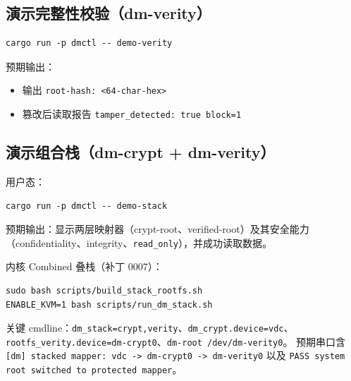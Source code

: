 \subsection{演示完整性校验（dm-verity）}

\begin{lstlisting}[basicstyle=\ttfamily\small, breaklines=true]
cargo run -p dmctl -- demo-verity
\end{lstlisting}

预期输出：
\begin{itemize}
    \item 输出 \texttt{root-hash: <64-char-hex>}
    \item 篡改后读取报告 \texttt{tamper\_\allowbreak detected: true block=1}
\end{itemize}

\subsection{演示组合栈（dm-crypt + dm-verity）}

用户态：

\begin{lstlisting}[basicstyle=\ttfamily\small, breaklines=true]
cargo run -p dmctl -- demo-stack
\end{lstlisting}

预期输出：显示两层映射器（crypt-root、verified-root）及其安全能力（confidentiality、integrity、\texttt{read\_\allowbreak only}），并成功读取数据。

内核 Combined 叠栈（补丁 0007）：

\begin{lstlisting}[basicstyle=\ttfamily\small, breaklines=true]
sudo bash scripts/build_stack_rootfs.sh
ENABLE_KVM=1 bash scripts/run_dm_stack.sh
\end{lstlisting}

\begin{sloppypar}
关键 cmdline：\texttt{dm\_\allowbreak stack=\allowbreak crypt,\allowbreak verity}、\allowbreak\texttt{dm\_\allowbreak crypt.\allowbreak device=\allowbreak vdc}、\allowbreak\texttt{rootfs\_\allowbreak verity.\allowbreak device=\allowbreak dm-\allowbreak crypt0}、\allowbreak\texttt{dm-\allowbreak root /dev/\allowbreak dm-\allowbreak verity0}。
预期串口含 \texttt{[dm] stacked mapper: vdc \allowbreak -> \allowbreak dm-\allowbreak crypt0 \allowbreak -> \allowbreak dm-\allowbreak verity0}
以及 \texttt{PASS system root switched to protected mapper}。
\end{sloppypar}

